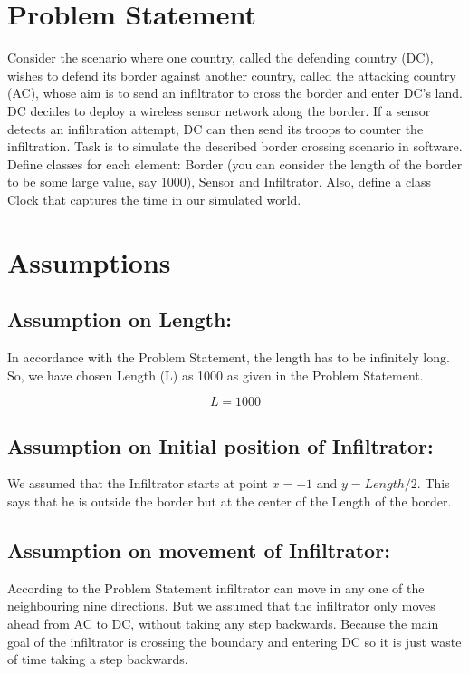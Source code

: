 \documentclass[12pt]{article}
\begin{document}
\maketitle


\section{Problem Statement}
Consider the scenario where one country, called the defending country (DC), wishes to defend its border against another country, called the attacking country (AC), whose aim is to send an infiltrator to cross the border and enter DC’s land. DC decides to deploy a wireless sensor network along the border. If a sensor detects an infiltration attempt, DC can then send its troops to counter the infiltration. Task is to simulate the described border crossing scenario in software. Define classes for each element: Border (you can consider the length of the border to be some large value, say 1000), Sensor and Infiltrator. Also, define a class Clock that captures the time in our simulated world.


\section{Assumptions}
\subsection{Assumption on Length:}
In accordance with the Problem Statement, the length has to be infinitely long. So, we have chosen Length (L) as 1000 as given in the Problem Statement.

\begin{equation*}
    L = 1000
\end{equation*}

\subsection{Assumption on Initial position of Infiltrator:} 
We assumed that the Infiltrator starts at point $x = -1$ and $y = Length/2$. This says that he is outside the border but at the center of the Length of the border. 

\subsection{Assumption on movement of Infiltrator:}
According to the Problem Statement infiltrator can move in any one of the neighbouring nine directions. But we assumed that the infiltrator only moves ahead from AC to DC, without taking any step backwards. Because the main goal of the infiltrator is crossing the boundary and entering DC so it is just waste of time taking a step backwards.
\end{document}
